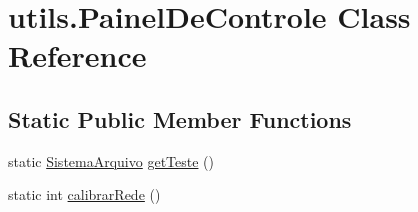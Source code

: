 \hypertarget{classutils_1_1_painel_de_controle}{\section{utils.\+Painel\+De\+Controle Class Reference}
\label{classutils_1_1_painel_de_controle}
}
\subsection*{Static Public Member Functions}
\begin{DoxyCompactItemize}
\item 
static \hyperlink{classservidor_1_1_sistema_arquivo}{Sistema\+Arquivo} \hyperlink{classutils_1_1_painel_de_controle_a28b7d3e0459bcc6aca0368e389b686d9}{get\+Teste} ()
\item 
static int \hyperlink{classutils_1_1_painel_de_controle_a99106f0d6ede35fca232cb2af6c0f424}{calibrar\+Rede} ()
\end{DoxyCompactItemize}
